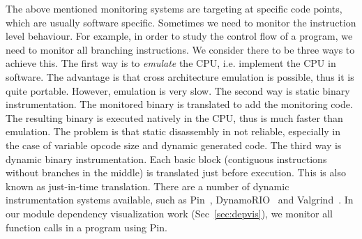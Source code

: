 The above mentioned monitoring systems are targeting at specific
code points, which are usually software specific.
Sometimes we need to monitor the instruction level behaviour.
For example, in order to study the control flow of a program,
we need to monitor all branching instructions.
We consider there to be three ways to achieve this.
The first way is to {\em emulate} the CPU, i.e.
implement the CPU in software.
The advantage is that cross architecture emulation is possible, thus
it is quite portable.
However, emulation is very slow.
The second way is static binary instrumentation.
The monitored binary is translated to add the monitoring code.
The resulting binary is executed natively in the CPU,
thus is much faster than emulation.
The problem is that static disassembly in not reliable, especially
in the case of variable opcode size and dynamic generated code.
The third way is dynamic binary instrumentation.
Each basic block (contiguous instructions without branches in the middle)
is translated just before execution.
This is also known as just-in-time translation.
There are a number of dynamic instrumentation systems available,
such as Pin~\cite{luk2005pin}, DynamoRIO~\cite{bruening2004dynamorio}
and Valgrind~\cite{nethercote2003valgrind}.
In our module dependency visualization work (Sec~\ref{sec:depvis}),
we monitor all function calls in a program using Pin.
